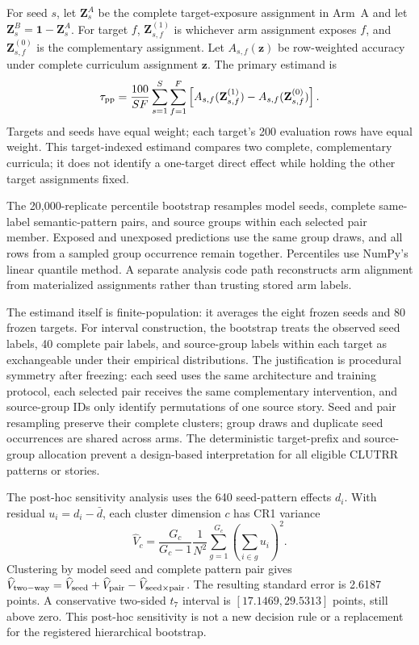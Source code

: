 For seed $s$, let $\mathbf Z_s^A$ be the complete target-exposure assignment
in Arm~A and let $\mathbf Z_s^B=\mathbf 1-\mathbf Z_s^A$.  For target $f$,
$\mathbf Z_{s,f}^{(1)}$ is whichever arm assignment exposes $f$, and
$\mathbf Z_{s,f}^{(0)}$ is the complementary assignment.  Let
$A_{s,f}(\mathbf z)$ be row-weighted accuracy under complete curriculum
assignment $\mathbf z$.  The primary estimand is
\begin{equation}
\tau_{\rm pp}
=
\frac{100}{SF}
\sum_{s=1}^{S}\sum_{f=1}^{F}
\left[
A_{s,f}(\mathbf Z_{s,f}^{(1)})
-A_{s,f}(\mathbf Z_{s,f}^{(0)})
\right].
\end{equation}
Targets and seeds have equal weight; each target's 200 evaluation rows have
equal weight.  This target-indexed estimand compares two complete,
complementary curricula; it does not identify a one-target direct effect while
holding the other target assignments fixed.

The 20,000-replicate percentile bootstrap resamples model seeds, complete
same-label semantic-pattern pairs, and source groups within each selected
pair member.  Exposed and unexposed predictions use the same group draws, and
all rows from a sampled group occurrence remain together.  Percentiles use
NumPy's linear quantile method.  A separate analysis code path reconstructs
arm alignment from materialized assignments rather than trusting stored arm
labels.

The estimand itself is finite-population: it averages the eight frozen seeds
and 80 frozen targets.  For interval construction, the bootstrap treats the
observed seed labels, 40 complete pair labels, and source-group labels within
each target as exchangeable under their empirical distributions.  The
justification is procedural symmetry after freezing: each seed uses the same
architecture and training protocol, each selected pair receives the same
complementary intervention, and source-group IDs only identify permutations
of one source story.  Seed and pair resampling preserve their complete
clusters; group draws and duplicate seed occurrences are shared across arms.
The deterministic target-prefix and source-group allocation prevent a
design-based interpretation for all eligible CLUTRR patterns or stories.

The post-hoc sensitivity analysis uses the 640 seed-pattern effects
\(d_i\).  With residual
\(u_i=d_i-\bar d\), each cluster dimension \(c\) has CR1 variance
\[
\widehat V_c=
\frac{G_c}{G_c-1}\frac{1}{N^2}
\sum_{g=1}^{G_c}\left(\sum_{i\in g}u_i\right)^2.
\]
Clustering by model seed and complete pattern pair gives
\(\widehat V_{\rm two-way}
=\widehat V_{\rm seed}+\widehat V_{\rm pair}
-\widehat V_{\rm seed\times pair}\).
The resulting standard error is 2.6187 points.  A conservative two-sided
\(t_7\) interval is \([17.1469,29.5313]\) points, still above zero.  This
post-hoc sensitivity is not a new decision rule or a replacement for the registered
hierarchical bootstrap.

